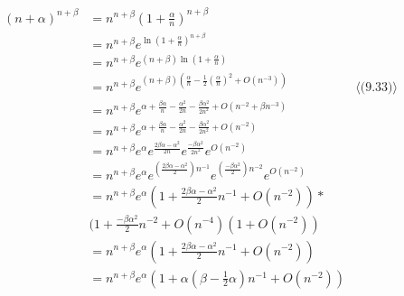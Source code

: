 \documentclass{article}
\begin{document}
\begin{align*}
(n+\alpha)^{n+\beta} & = n^{n+\beta}(1+\frac{\alpha}{n})^{n+\beta} \\
                     & = n^{n+\beta} e^{\ln (1+\frac{\alpha}{n})^{n+\beta}}\\
                     & = n^{n+\beta} e^{(n+\beta)\ln (1+\frac{\alpha}{n})}\\
                     & = n^{n+\beta} e^{(n+\beta) (\frac{\alpha}{n}-\frac{1}{2}(\frac{\alpha}{n})^2+O(n^{-3}))}
                         & \langle \text{(9.33)} \rangle \\
                     & = n^{n+\beta} e^{\alpha+\frac{\beta\alpha}{n}-\frac{\alpha^2}{2n}-\frac{\beta\alpha^2}{2n^2}+O(n^{-2}+\beta n^{-3})} \\
                     & = n^{n+\beta} e^{\alpha+\frac{\beta\alpha}{n}-\frac{\alpha^2}{2n}-\frac{\beta\alpha^2}{2n^2}+O(n^{-2})} \\
                     & = n^{n+\beta} e^{\alpha}e^{\frac{2\beta\alpha-\alpha^2}{2n}}e^{\frac{-\beta\alpha^2}{2n^2}}e^{O(n^{-2})} \\
                     & = n^{n+\beta} e^{\alpha}e^{(\frac{2\beta\alpha-\alpha^2}{2})n^{-1}}e^{(\frac{-\beta\alpha^2}{2})n^{-2}}e^{O(n^{-2})} \\
                     & = n^{n+\beta}
                         e^{\alpha}
                         (1 + \frac{2\beta\alpha-\alpha^2}{2}n^{-1}+O(n^{-2}))* \\
                         & (1+\frac{-\beta\alpha^2}{2}n^{-2}+O(n^{-4})
                         (1+O(n^{-2})) \\
                     & = n^{n+\beta} e^{\alpha} (1 + \frac{2\beta\alpha-\alpha^2}{2}n^{-1}+O(n^{-2})) \\
                     & = n^{n+\beta} e^{\alpha} (1 + \alpha (\beta - \frac{1}{2}\alpha) n^{-1}+O(n^{-2})) \\
\end{align*}


\section{}
\end{document}

